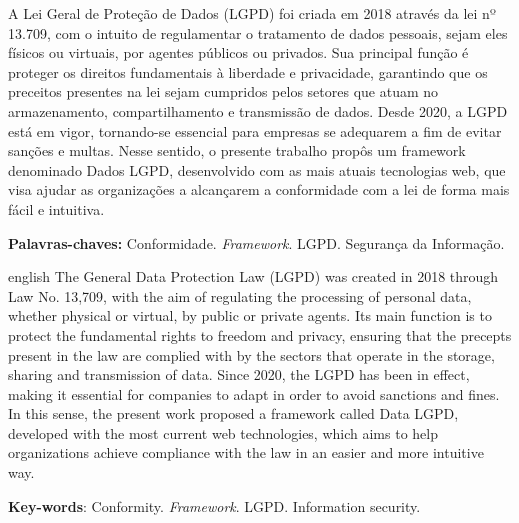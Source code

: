\documentclass[
	12pt,				%
	openright,			%
	oneside,			%
	a4paper,			%
	english,			%
	french,				%
	spanish,			%
	brazil,				%
	]{abntex2}
\begin{document}
\begin{resumo}
\noindent
A Lei Geral de Proteção de Dados (LGPD) foi criada em 2018 através da lei nº 13.709, com o intuito de regulamentar o tratamento de dados pessoais, sejam eles físicos ou virtuais, por agentes públicos ou privados. Sua principal função é proteger os direitos fundamentais à liberdade e privacidade, garantindo que os preceitos presentes na lei sejam cumpridos pelos setores que atuam no armazenamento, compartilhamento e transmissão de dados. Desde 2020, a LGPD está em vigor, tornando-se essencial para empresas se adequarem a fim de evitar sanções e multas. Nesse sentido, o presente trabalho propôs um framework denominado Dados LGPD, desenvolvido com as mais atuais tecnologias web, que visa ajudar as organizações a alcançarem a conformidade com a lei de forma mais fácil e intuitiva.

 \vspace{\onelineskip}
    
 \noindent
 \textbf{Palavras-chaves:} Conformidade. \textit{Framework}. LGPD. Segurança da Informação.
\end{resumo}

\begin{resumo}[Abstract]
 \begin{otherlanguage*}{english}
   \vspace{\onelineskip}
    \noindent 
The General Data Protection Law (LGPD) was created in 2018 through Law No. 13,709, with the aim of regulating the processing of personal data, whether physical or virtual, by public or private agents. Its main function is to protect the fundamental rights to freedom and privacy, ensuring that the precepts present in the law are complied with by the sectors that operate in the storage, sharing and transmission of data. Since 2020, the LGPD has been in effect, making it essential for companies to adapt in order to avoid sanctions and fines. In this sense, the present work proposed a framework called Data LGPD, developed with the most current web technologies, which aims to help organizations achieve compliance with the law in an easier and more intuitive way.
   
   \vspace{\onelineskip}
   
   \noindent  \textbf{Key-words}:  Conformity. \textit{Framework}. LGPD. Information security.
 \end{otherlanguage*}
\end{resumo}
\end{document}
